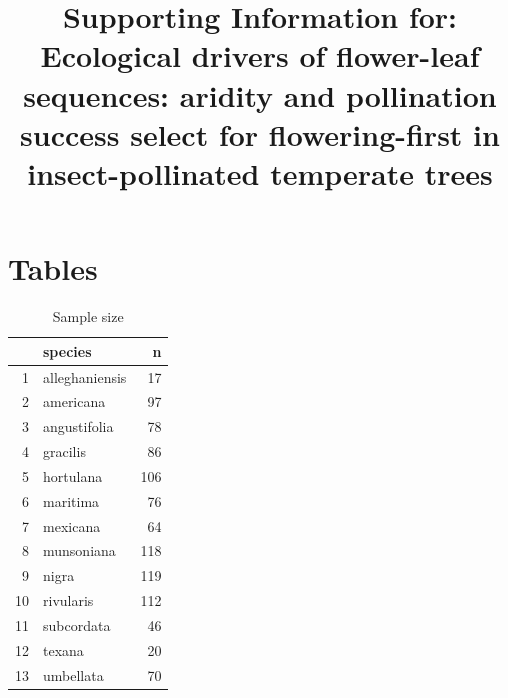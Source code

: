 \documentclass{article}[11pt]
\title{Supporting Information for: Ecological drivers of flower-leaf sequences: aridity and pollination success select for flowering-first in insect-pollinated temperate trees} %
\date{}
\begin{document}

\maketitle

\section*{Tables}
\begin{table}[ht]
\centering
\begin{tabular}{rlr}
  \hline
 & species & n \\ 
  \hline
1 & alleghaniensis &  17 \\ 
  2 & americana &  97 \\ 
  3 & angustifolia &  78 \\ 
  4 & gracilis &  86 \\ 
  5 & hortulana & 106 \\ 
  6 & maritima &  76 \\ 
  7 & mexicana &  64 \\ 
  8 & munsoniana & 118 \\ 
  9 & nigra & 119 \\ 
  10 & rivularis & 112 \\ 
  11 & subcordata &  46 \\ 
  12 & texana &  20 \\ 
  13 & umbellata &  70 \\ 
   \hline
\end{tabular}

\caption{Sample size}
\label{tab:samps}
\end{table}
\end{document}
